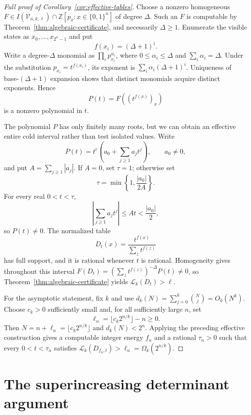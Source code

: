 \documentclass{article}
\newcommand{\LC}{\mathcal{L}}
\newcommand{\bits}{\{0,1\}}
\begin{document}
\begin{proof}[Full proof of Corollary~\ref{cor:effective-tables}]
Choose a nonzero homogeneous
$F\in I(\mathcal V_{n,k,\ell})\cap\mathbb Z[p_x:x\in\bits^n]$ of degree
$\Delta$.  Such an $F$ is computable by Theorem~\ref{thm:algebraic-certificate},
and necessarily $\Delta\ge1$.  Enumerate the visible states as
$x_0,\ldots,x_{2^n-1}$ and put
\[
  f(x_i)=(\Delta+1)^i.
\]
Write a degree-$\Delta$ monomial as
$\prod_i p_{x_i}^{\alpha_i}$, where $0\le\alpha_i\le\Delta$ and
$\sum_i\alpha_i=\Delta$.  Under the substitution
$p_{x_i}=t^{f(x_i)}$, its exponent is
$\sum_i\alpha_i(\Delta+1)^i$.  Uniqueness of base-$(\Delta+1)$ expansion shows
that distinct monomials acquire distinct exponents.  Hence
\[
  P(t)=F((t^{f(x)})_x)
\]
is a nonzero polynomial in $t$.

The polynomial $P$ has only finitely many roots, but we can obtain an effective
entire cold interval rather than test isolated values.  Write
\[
  P(t)=t^e\left(a_0+\sum_{j\ge1}a_jt^j\right),
  \qquad a_0\ne0,
\]
and put $A=\sum_{j\ge1}|a_j|$.  If $A=0$, set $\tau=1$; otherwise set
\[
  \tau=\min\left\{1,\frac{|a_0|}{2A}\right\}.
\]
For every real $0<t<\tau$,
\[
  \left|\sum_{j\ge1}a_jt^j\right|
  \le At<\frac{|a_0|}{2},
\]
so $P(t)\ne0$.  The normalized table
\[
  D_t(x)=\frac{t^{f(x)}}{\sum_z t^{f(z)}}
\]
has full support, and it is rational whenever $t$ is rational.  Homogeneity
gives throughout this interval
$F(D_t)=(\sum_z t^{f(z)})^{-\Delta}P(t)\ne0$, so
Theorem~\ref{thm:algebraic-certificate} yields $\LC_k(D_t)>\ell$.

For the asymptotic statement, fix $k$ and use
$d_k(N)=\sum_{j=0}^k\binom Nj=O_k(N^k)$.  Choose $c_k>0$ sufficiently small
and, for all sufficiently large $n$, set
\[
  \ell_n=\lfloor c_k2^{n/k}\rfloor-n\ge0.
\]
Then $N=n+\ell_n=\lfloor c_k2^{n/k}\rfloor$ and
$d_k(N)<2^n$.  Applying the preceding effective construction gives a
computable integer energy $f_n$ and a rational $\tau_n>0$ such that every
$0<t<\tau_n$ satisfies
$\LC_k(D_{f_n,t})>\ell_n=\Omega_k(2^{n/k})$.
\end{proof}

\section{The superincreasing determinant argument}
\label{app:superincreasing-details}
\end{document}
